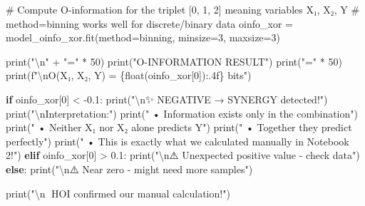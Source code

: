 \documentclass[
  11pt,
  letterpaper,
  oneside,
  openany]{book}
\newenvironment{Shaded}{\begin{snugshade}}{\end{snugshade}}
\newcommand{\BuiltInTok}[1]{\textcolor[rgb]{0.00,0.23,0.31}{#1}}
\newcommand{\CharTok}[1]{\textcolor[rgb]{0.13,0.47,0.30}{#1}}
\newcommand{\CommentTok}[1]{\textcolor[rgb]{0.37,0.37,0.37}{#1}}
\newcommand{\ControlFlowTok}[1]{\textcolor[rgb]{0.00,0.23,0.31}{\textbf{#1}}}
\newcommand{\DecValTok}[1]{\textcolor[rgb]{0.68,0.00,0.00}{#1}}
\newcommand{\FloatTok}[1]{\textcolor[rgb]{0.68,0.00,0.00}{#1}}
\newcommand{\NormalTok}[1]{\textcolor[rgb]{0.00,0.23,0.31}{#1}}
\newcommand{\OperatorTok}[1]{\textcolor[rgb]{0.37,0.37,0.37}{#1}}
\newcommand{\SpecialCharTok}[1]{\textcolor[rgb]{0.37,0.37,0.37}{#1}}
\newcommand{\SpecialStringTok}[1]{\textcolor[rgb]{0.13,0.47,0.30}{#1}}
\newcommand{\StringTok}[1]{\textcolor[rgb]{0.13,0.47,0.30}{#1}}
\begin{document}
\begin{Shaded}
\begin{Highlighting}[]
\CommentTok{\# Compute O{-}information for the triplet [0, 1, 2] meaning variables X₁, X₂, Y}
\CommentTok{\# method=\textquotesingle{}binning\textquotesingle{} works well for discrete/binary data}
\NormalTok{oinfo\_xor }\OperatorTok{=}\NormalTok{ model\_oinfo\_xor.fit(method}\OperatorTok{=}\StringTok{\textquotesingle{}binning\textquotesingle{}}\NormalTok{, minsize}\OperatorTok{=}\DecValTok{3}\NormalTok{, maxsize}\OperatorTok{=}\DecValTok{3}\NormalTok{)}

\BuiltInTok{print}\NormalTok{(}\StringTok{"}\CharTok{\textbackslash{}n}\StringTok{"} \OperatorTok{+} \StringTok{"="} \OperatorTok{*} \DecValTok{50}\NormalTok{)}
\BuiltInTok{print}\NormalTok{(}\StringTok{"O{-}INFORMATION RESULT"}\NormalTok{)}
\BuiltInTok{print}\NormalTok{(}\StringTok{"="} \OperatorTok{*} \DecValTok{50}\NormalTok{)}
\BuiltInTok{print}\NormalTok{(}\SpecialStringTok{f"}\CharTok{\textbackslash{}n}\SpecialStringTok{O(X₁, X₂, Y) = }\SpecialCharTok{\{}\BuiltInTok{float}\NormalTok{(oinfo\_xor[}\DecValTok{0}\NormalTok{])}\SpecialCharTok{:.4f\}}\SpecialStringTok{ bits"}\NormalTok{)}

\ControlFlowTok{if}\NormalTok{ oinfo\_xor[}\DecValTok{0}\NormalTok{] }\OperatorTok{\textless{}} \OperatorTok{{-}}\FloatTok{0.1}\NormalTok{:}
    \BuiltInTok{print}\NormalTok{(}\StringTok{"}\CharTok{\textbackslash{}n}\StringTok{✨ NEGATIVE → SYNERGY detected!"}\NormalTok{)}
    \BuiltInTok{print}\NormalTok{(}\StringTok{"}\CharTok{\textbackslash{}n}\StringTok{Interpretation:"}\NormalTok{)}
    \BuiltInTok{print}\NormalTok{(}\StringTok{"  • Information exists only in the combination"}\NormalTok{)}
    \BuiltInTok{print}\NormalTok{(}\StringTok{"  • Neither X₁ nor X₂ alone predicts Y"}\NormalTok{)}
    \BuiltInTok{print}\NormalTok{(}\StringTok{"  • Together they predict perfectly"}\NormalTok{)}
    \BuiltInTok{print}\NormalTok{(}\StringTok{"  • This is exactly what we calculated manually in Notebook 2!"}\NormalTok{)}
\ControlFlowTok{elif}\NormalTok{ oinfo\_xor[}\DecValTok{0}\NormalTok{] }\OperatorTok{\textgreater{}} \FloatTok{0.1}\NormalTok{:}
    \BuiltInTok{print}\NormalTok{(}\StringTok{"}\CharTok{\textbackslash{}n}\StringTok{⚠️  Unexpected positive value {-} check data"}\NormalTok{)}
\ControlFlowTok{else}\NormalTok{:}
    \BuiltInTok{print}\NormalTok{(}\StringTok{"}\CharTok{\textbackslash{}n}\StringTok{⚠️  Near zero {-} might need more samples"}\NormalTok{)}

\BuiltInTok{print}\NormalTok{(}\StringTok{"}\CharTok{\textbackslash{}n}\StringTok{🎯 HOI confirmed our manual calculation!"}\NormalTok{)}
\end{Highlighting}
\end{Shaded}
\end{document}

